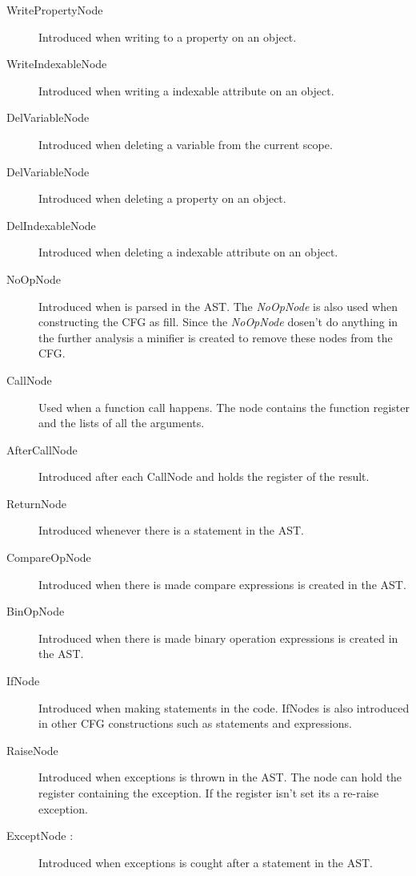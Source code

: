 \begin{description}
	\item[WritePropertyNode ] Introduced when writing to a property on an object.
	\item[WriteIndexableNode ] Introduced when writing a indexable attribute on an object.
	\item[DelVariableNode ] Introduced when deleting a variable from the current scope.
	\item[DelVariableNode ] Introduced when deleting a property on an object.
	\item[DelIndexableNode ] Introduced when deleting a indexable attribute on an object.
	\item[NoOpNode ] Introduced when  is parsed in the AST. The \textit{NoOpNode} is also used when constructing the CFG as fill. Since the \textit{NoOpNode} dosen't do anything in the further analysis a minifier is created to remove these nodes from the CFG.
	\item[CallNode ] Used when a function call happens. The node contains the function register and the lists of all the arguments.
	\item[AfterCallNode] Introduced after each CallNode and holds the register of the result.
	\item[ReturnNode ] Introduced whenever there is a  statement in the AST. 
	\item[CompareOpNode ] Introduced when there is made compare expressions is created in the AST.
	\item[BinOpNode ] Introduced when there is made binary operation expressions is created in the AST.
	\item[IfNode ] Introduced when making  statements in the code. IfNodes is also introduced in other CFG constructions such as  statements and  expressions.
	\item[RaiseNode ] Introduced when exceptions is thrown in the AST. The node can hold the register containing the exception. If the register isn't set its a re-raise exception.
	\item[ExceptNode :] Introduced when exceptions is cought after a  statement in the AST.
\end{description}